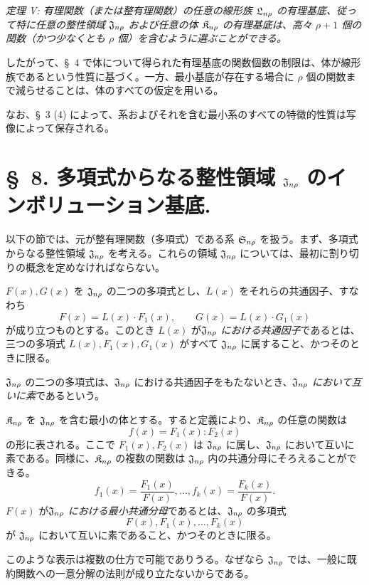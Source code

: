 \documentclass[11pt]{jlreq}
\begin{document}
\emph{定理 V: 有理関数（または整有理関数）の任意の線形族 $\mathfrak{L}_{n\rho}$ の有理基底、従って特に任意の整性領域 $\mathfrak{J}_{n\rho}$ および任意の体 $\mathfrak{K}_{n\rho}$ の有理基底は、高々 $\rho+1$ 個の関数（かつ少なくとも $\rho$ 個）を含むように選ぶことができる。}

したがって、\S\ 4 で体について得られた有理基底の関数個数の制限は、体が線形族であるという性質に基づく。一方、最小基底が存在する場合に $\rho$ 個の関数まで減らせることは、体のすべての仮定を用いる。

なお、\S\ 3 (4) によって、系およびそれを含む最小系のすべての特徴的性質は写像によって保存される。

\section*{\S\ 8. 多項式からなる整性領域 $\mathfrak{J}_{n\rho}$ のインボリューション基底.}

以下の節では、元が整有理関数（多項式）である系 $\mathfrak{S}_{n\rho}$ を扱う。まず、多項式からなる整性領域 $\mathfrak{J}_{n\rho}$ を考える。これらの領域 $\mathfrak{J}_{n\rho}$ については、最初に割り切りの概念を定めなければならない。

$F(x),G(x)$ を $\mathfrak{J}_{n\rho}$ の二つの多項式とし、$L(x)$ をそれらの共通因子、すなわち
\[
  F(x)=L(x)\cdot F_1(x),\qquad G(x)=L(x)\cdot G_1(x)
\]
が成り立つものとする。このとき $L(x)$ が\emph{$\mathfrak{J}_{n\rho}$ における共通因子}であるとは、三つの多項式 $L(x),F_1(x),G_1(x)$ がすべて $\mathfrak{J}_{n\rho}$ に属すること、かつそのときに限る。

$\mathfrak{J}_{n\rho}$ の二つの多項式は、$\mathfrak{J}_{n\rho}$ における共通因子をもたないとき、\emph{$\mathfrak{J}_{n\rho}$ において互いに素}であるという。

$\mathfrak{K}_{n\rho}$ を $\mathfrak{J}_{n\rho}$ を含む最小の体とする。すると定義により、$\mathfrak{K}_{n\rho}$ の任意の関数は
\[
  f(x)=F_1(x):F_2(x)
\]
の形に表される。ここで $F_1(x),F_2(x)$ は $\mathfrak{J}_{n\rho}$ に属し、$\mathfrak{J}_{n\rho}$ において互いに素である。同様に、$\mathfrak{K}_{n\rho}$ の複数の関数は $\mathfrak{J}_{n\rho}$ 内の共通分母にそろえることができる。
\[
  f_1(x)=\frac{F_1(x)}{F(x)},\ldots,
  f_k(x)=\frac{F_k(x)}{F(x)}.
\]
$F(x)$ が\emph{$\mathfrak{J}_{n\rho}$ における最小共通分母}であるとは、$\mathfrak{J}_{n\rho}$ の多項式
\[
  F(x),F_1(x),\ldots,F_k(x)
\]
が $\mathfrak{J}_{n\rho}$ において互いに素であること、かつそのときに限る。

このような表示は複数の仕方で可能でありうる。なぜなら $\mathfrak{J}_{n\rho}$ では、一般に既約関数への一意分解の法則が成り立たないからである。
\end{document}

